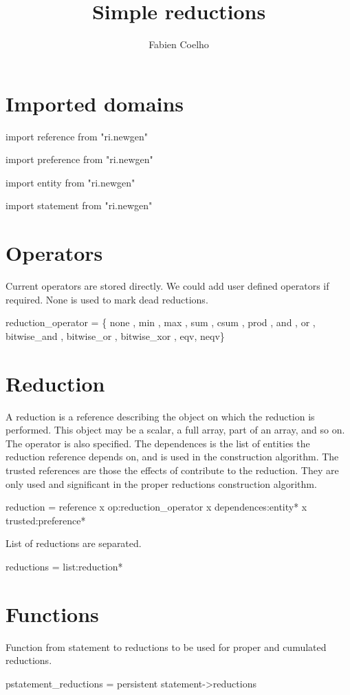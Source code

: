 \documentclass[a4paper]{article}
\title{Simple reductions}
\author{Fabien Coelho}
\newcommand{\domain}[1]{\par{#1}}
\begin{document}
\maketitle

\section{Imported domains}
\label{sec:import}

\domain{import reference from "ri.newgen"}
\domain{import preference from "ri.newgen"}
\domain{import entity from "ri.newgen"}
\domain{import statement from "ri.newgen"}

\section{Operators}
\label{sec:operators}

Current operators are stored directly.
We could add user defined operators if required.
None is used to mark dead reductions. 

\domain{reduction\_operator = \{ none , min , max , sum , csum , prod , and , or , bitwise\_and , bitwise\_or , bitwise\_xor , eqv, neqv\}}
{}

\section{Reduction}
\label{sec:reduction}

A reduction is a reference describing the object on which the reduction is
performed. This object may be a scalar, a full array, part of an array,
and so on. The operator is also specified. The dependences is the list of
entities the reduction reference depends on, and is used in the
construction algorithm. The trusted references are those the effects of
contribute to the reduction. They are only used and significant in the
proper reductions construction algorithm.

\domain{reduction = reference x op:reduction\_operator x dependences:entity* x trusted:preference*}
{}

List of reductions are separated.

\domain{reductions = list:reduction*}
{}


\section{Functions}
\label{sec:functions}

Function from statement to reductions to be used for proper and cumulated
reductions. 

\domain{pstatement\_reductions = persistent statement->reductions}
{}
\end{document}

